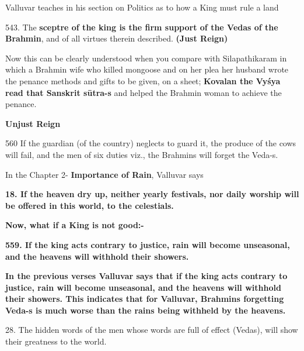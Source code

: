 Valluvar teaches in his section on Politics as to how a King must rule a land

543. The \textbf{sceptre of the king is the firm support of the Vedas of the Brahmin}, and of all virtues therein described. \textbf{(Just Reign)}

Now this can be clearly understood when you compare with Silapathikaram in which a Brahmin wife who killed mongoose and on her plea her husband wrote the penance methods and gifts to be given, on a sheet; \textbf{Kovalan the Vyśya read that Sanskrit sūtra-s} and helped the Brahmin woman to achieve the penance.

\textbf{Unjust Reign}

560  If the guardian (of the country) neglects to guard it, the produce of the cows will fail, and the men of six duties viz., the Brahmins will forget the Veda-s.

In the Chapter 2- \textbf{Importance of Rain}, Valluvar says

\textbf{18. If the heaven dry up, neither yearly festivals, nor daily worship will be offered in this world, to the celestials.}

\textbf{Now, what if a King is not good:-}

\textbf{559. If the king acts contrary to justice, rain will become unseasonal, and the heavens will withhold their showers.}

\vskip 2pt

\textbf{In the previous verses Valluvar says that if the king acts contrary to justice, rain will become unseasonal, and the heavens will withhold their showers. This indicates that for Valluvar, Brahmins forgetting Veda-s is much worse than the rains being withheld by the heavens.}

\vskip 2pt

28. The hidden words of the men whose words are full of effect (Vedas), will show their greatness to the world.

